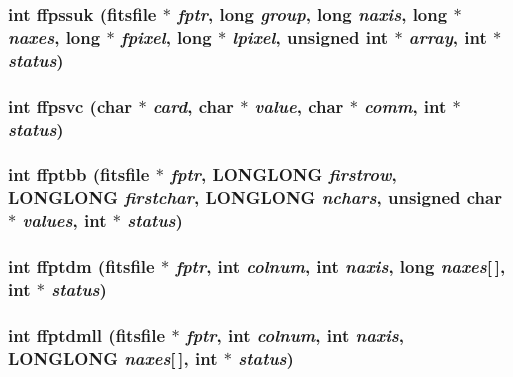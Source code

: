\subsubsection{\setlength{\rightskip}{0pt plus 5cm}int ffpssuk (\bf{fitsfile} $\ast$ {\em fptr}, long {\em group}, long {\em naxis}, long $\ast$ {\em naxes}, long $\ast$ {\em fpixel}, long $\ast$ {\em lpixel}, unsigned int $\ast$ {\em array}, int $\ast$ {\em status})}\label{fitsio_8h_6211df3aa144d88cda8fd8fe8eade594}


\subsubsection{\setlength{\rightskip}{0pt plus 5cm}int ffpsvc (char $\ast$ {\em card}, char $\ast$ {\em value}, char $\ast$ {\em comm}, int $\ast$ {\em status})}\label{fitsio_8h_9a1a8933359feb3576cc14a1e5c671c5}


\subsubsection{\setlength{\rightskip}{0pt plus 5cm}int ffptbb (\bf{fitsfile} $\ast$ {\em fptr}, \bf{LONGLONG} {\em firstrow}, \bf{LONGLONG} {\em firstchar}, \bf{LONGLONG} {\em nchars}, unsigned char $\ast$ {\em values}, int $\ast$ {\em status})}\label{fitsio_8h_8154f91f7c90d22f49af94d61d443036}


\subsubsection{\setlength{\rightskip}{0pt plus 5cm}int ffptdm (\bf{fitsfile} $\ast$ {\em fptr}, int {\em colnum}, int {\em naxis}, long {\em naxes}[$\,$], int $\ast$ {\em status})}\label{fitsio_8h_61fee5f0940f088541578184fae78ee2}


\subsubsection{\setlength{\rightskip}{0pt plus 5cm}int ffptdmll (\bf{fitsfile} $\ast$ {\em fptr}, int {\em colnum}, int {\em naxis}, \bf{LONGLONG} {\em naxes}[$\,$], int $\ast$ {\em status})}\label{fitsio_8h_06197ea3bc9da99920d903dd807b11a9}


